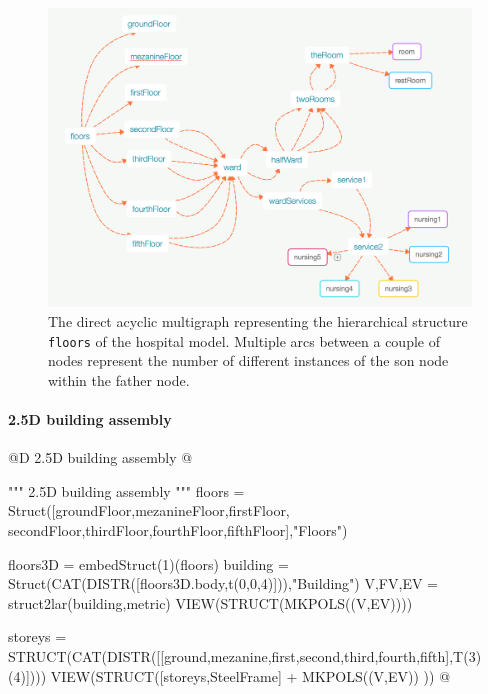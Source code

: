 \documentclass[11pt,oneside]{article}    %
\begin{document}
\begin{figure}[htbp] %
   \centering
   \includegraphics[width=\linewidth]{images/multigraph} 
   \caption{The direct acyclic multigraph representing the hierarchical structure \texttt{floors} of the hospital model. 
   Multiple arcs between a couple of nodes represent the number of different instances of the son node within the father node.}
   \label{fig:multigraph}
\end{figure}

\paragraph{2.5D building assembly}
@D 2.5D building assembly
@{""" 2.5D building assembly """        
floors = Struct([groundFloor,mezanineFloor,firstFloor,
                 secondFloor,thirdFloor,fourthFloor,fifthFloor],"Floors")

floors3D = embedStruct(1)(floors)
building = Struct(CAT(DISTR([floors3D.body,t(0,0,4)])),"Building")
V,FV,EV = struct2lar(building,metric)
VIEW(STRUCT(MKPOLS((V,EV))))

storeys = STRUCT(CAT(DISTR([[ground,mezanine,first,second,third,fourth,fifth],T(3)(4)])))
VIEW(STRUCT([storeys,SteelFrame] + MKPOLS((V,EV)) ))
@}
\end{document}
